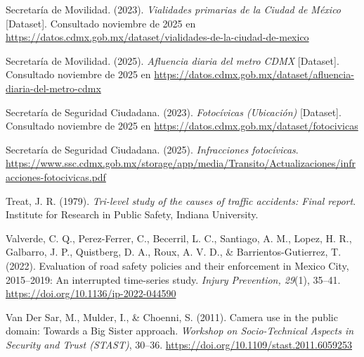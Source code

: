 \begin{thebibliography}{}
Secretaría de Movilidad. (2023). \textit{Vialidades primarias de la Ciudad de México} [Dataset]. Consultado noviembre de 2025 en \url{https://datos.cdmx.gob.mx/dataset/vialidades-de-la-ciudad-de-mexico}

Secretaría de Movilidad. (2025). \textit{Afluencia diaria del metro CDMX} [Dataset]. Consultado noviembre de 2025 en \url{https://datos.cdmx.gob.mx/dataset/afluencia-diaria-del-metro-cdmx}

Secretaría de Seguridad Ciudadana. (2023). \textit{Fotoc\'ivicas (Ubicación)} [Dataset]. Consultado noviembre de 2025 en \url{https://datos.cdmx.gob.mx/dataset/fotocivicas}

Secretaría de Seguridad Ciudadana. (2025). \textit{Infracciones fotocívicas}. \url{https://www.ssc.cdmx.gob.mx/storage/app/media/Transito/Actualizaciones/infracciones-fotocivicas.pdf}

Treat, J. R. (1979). \textit{Tri-level study of the causes of traffic accidents: Final report}. Institute for Research in Public Safety, Indiana University.

Valverde, C. Q., Perez-Ferrer, C., Becerril, L. C., Santiago, A. M., Lopez, H. R., Galbarro, J. P., Quistberg, D. A., Roux, A. V. D., \& Barrientos-Gutierrez, T. (2022). Evaluation of road safety policies and their enforcement in Mexico City, 2015–2019: An interrupted time-series study. \textit{Injury Prevention, 29}(1), 35–41. \url{https://doi.org/10.1136/ip-2022-044590}

Van Der Sar, M., Mulder, I., \& Choenni, S. (2011). Camera use in the public domain: Towards a Big Sister approach. \textit{Workshop on Socio-Technical Aspects in Security and Trust (STAST)}, 30–36. \url{https://doi.org/10.1109/stast.2011.6059253}

\end{thebibliography}
